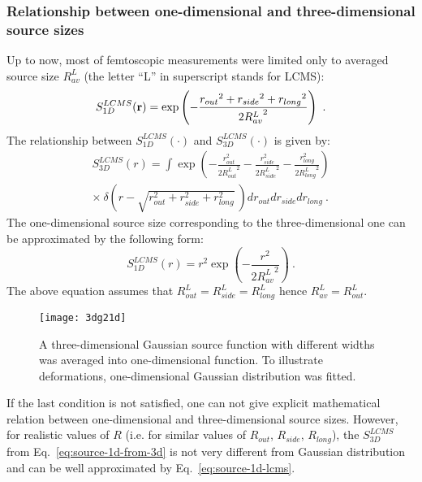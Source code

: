       \subsubsection{Relationship between one-dimensional and three-dimensional source sizes}
      Up to now, most of femtoscopic measurements were limited only to averaged source size $R^L_{av}$ (the letter ``L'' in superscript stands for LCMS):
      \begin{equation}
        S^{LCMS}_{1D} (\mathbf{r}) = \exp \left( - \frac{ {r_{out}}^{2} + {r_{side}}^{2} + {r_{long}}^{2}}{2 {R^{L}_{av}}^2} \right)~.
      \end{equation}
      The relationship between $S^{LCMS}_{1D}(\cdot)$ and $S^{LCMS}_{3D}(\cdot)$ is given by:
      \begin{equation}
        \begin{split}
        \label{eq:source-1d-from-3d}
        S^{LCMS}_{3D} (r) = \int \exp \left( 
          - \frac{ r_{out}^{2}}{2 {R^L_{out}}^2}
          - \frac{ r_{side}^{2}}{2 {R^L_{side}}^2}
          - \frac{ r_{long}^{2}}{2 {R^L_{long}}^2}
        \right)
        \\ \times~\delta \left(
          r - \sqrt{ r_{out}^{2} + r_{side}^{2} + r_{long}^{2}}
        ~\right)
        d r_{out} d r_{side} d r _{long}~.
        \end{split}
      \end{equation}
      The one-dimensional source size corresponding to the three-dimensional one can be approximated by the following form:
      \begin{equation}
        \label{eq:source-1d-lcms}
        S^{LCMS}_{1D} (r) = {r}^{2} \exp \left( - \frac{r^{2}}{2 {R^L_{av}}^2} \right)~.
      \end{equation}
      The above equation assumes that $R^L_{out} = R^L_{side} = R^L_{long}$ hence $R^L_{av} = R^L_{out}$.
      \begin{figure}[h]
        \centering
        \texttt{[image: 3dg21d]}
        \caption{A three-dimensional Gaussian source function with different widths was averaged into one-dimensional function. To illustrate deformations, one-dimensional Gaussian distribution was fitted.}
        \label{fig:3dgaussian}
      \end{figure}
      If the last condition is not satisfied, one can not give explicit mathematical relation between one-dimensional and three-dimensional source sizes.
      However, for realistic values of $R$ (i.e. for similar values of $R_{out}$, $R_{side}$, $R_{long}$), the $S^{LCMS}_{3D}$ from Eq.~\ref{eq:source-1d-from-3d} is not very different from Gaussian distribution and can be well approximated by Eq.~\ref{eq:source-1d-lcms}.

